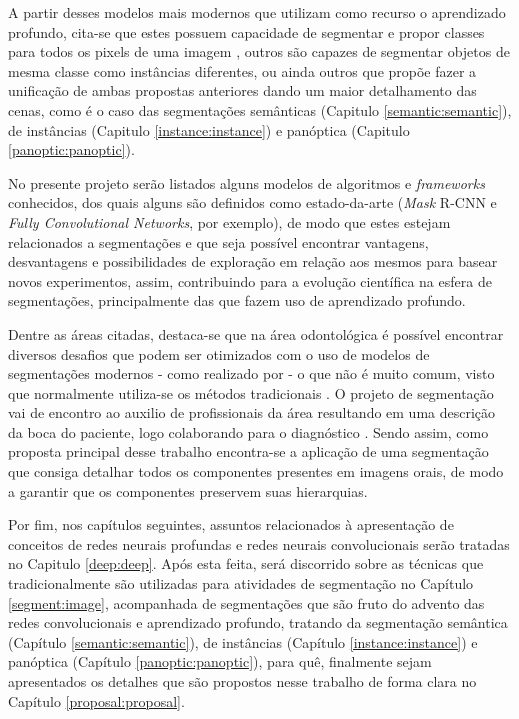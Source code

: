 A partir desses modelos mais modernos que utilizam como recurso o aprendizado profundo, cita-se que estes possuem capacidade de segmentar e propor classes para todos os pixels de uma imagem \cite{Minaee2021}, outros são capazes de segmentar objetos de mesma classe como instâncias diferentes, ou ainda outros que propõe fazer a unificação de ambas propostas anteriores dando um maior detalhamento das cenas, como é o caso das segmentações semânticas (Capitulo \ref{semantic:semantic}), de instâncias (Capitulo \ref{instance:instance}) e panóptica (Capitulo \ref{panoptic:panoptic}).

No presente projeto serão listados alguns modelos de algoritmos e \textit{frameworks} conhecidos, dos quais alguns são definidos como estado-da-arte (\textit{Mask} R-CNN e \textit{Fully Convolutional Networks}, por exemplo), de modo que estes estejam relacionados a segmentações e que seja possível encontrar vantagens, desvantagens e possibilidades de exploração em relação aos mesmos para basear novos experimentos, assim, contribuindo para a evolução científica na esfera de segmentações, principalmente das que fazem uso de aprendizado profundo.

Dentre as áreas citadas, destaca-se que na área odontológica é possível encontrar diversos desafios que podem ser otimizados com o uso de modelos de segmentações modernos - como realizado por \cite{Ghazvinian2021, Minyoung2020} - o que não é muito comum, visto que normalmente utiliza-se os métodos tradicionais \cite{Hammad2020}.  O projeto de segmentação vai de encontro ao auxilio de profissionais da área resultando em uma descrição da boca do paciente, logo colaborando para o diagnóstico \cite{Ghazvinian2021}. Sendo assim, como proposta principal desse trabalho encontra-se a aplicação de uma segmentação que consiga detalhar todos os componentes presentes em imagens orais, de modo a garantir que os componentes preservem suas hierarquias.

Por fim, nos capítulos seguintes, assuntos relacionados à apresentação de conceitos de redes neurais profundas e redes neurais convolucionais serão tratadas no Capitulo \ref{deep:deep}. Após esta feita, será discorrido sobre as técnicas que tradicionalmente são utilizadas para atividades de segmentação no Capítulo \ref{segment:image}, acompanhada de segmentações que são fruto do advento das redes convolucionais e aprendizado profundo, tratando da segmentação semântica (Capítulo \ref{semantic:semantic}), de instâncias (Capítulo \ref{instance:instance}) e panóptica (Capítulo \ref{panoptic:panoptic}), para quê, finalmente sejam apresentados os detalhes que são propostos nesse trabalho de forma clara no Capítulo \ref{proposal:proposal}.